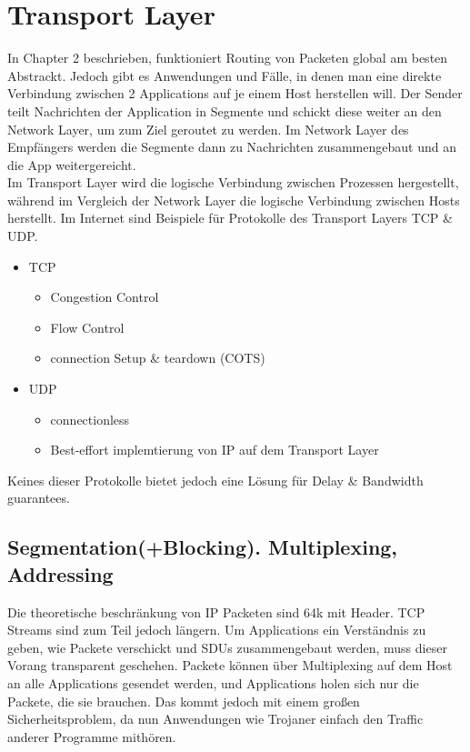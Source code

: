 \section{Transport Layer}
    In Chapter 2 beschrieben, funktioniert Routing von Packeten global am besten Abstrackt. Jedoch gibt es Anwendungen und Fälle, in denen man eine direkte Verbindung zwischen 2 Applications auf je einem Host herstellen will. Der Sender teilt Nachrichten der Application in Segmente und schickt diese weiter an den Network Layer, um zum Ziel geroutet zu werden. Im Network Layer des Empfängers werden die Segmente dann zu Nachrichten zusammengebaut und an die App weitergereicht. \\
    Im Transport Layer wird die logische Verbindung zwischen Prozessen hergestellt, während im Vergleich der Network Layer die logische Verbindung zwischen Hosts herstellt. Im Internet sind Beispiele für Protokolle des Transport Layers TCP \& UDP. 
    \begin{itemize}
        \item TCP
            \begin{itemize}
                \item Congestion Control
                \item Flow Control
                \item connection Setup \& teardown  (COTS)
            \end{itemize}
        \item UDP  
            \begin{itemize}
                \item connectionless
                \item Best-effort implemtierung von IP auf dem Transport Layer
            \end{itemize}
    \end{itemize}
    Keines dieser Protokolle bietet jedoch eine Lösung für Delay \& Bandwidth guarantees.

    \subsection{Segmentation(+Blocking). Multiplexing, Addressing}
        Die theoretische beschränkung von IP Packeten sind 64k mit Header. TCP Streams sind zum Teil jedoch längern. Um Applications ein Verständnis zu geben, wie Packete verschickt und SDUs zusammengebaut werden, muss dieser Vorang transparent geschehen. Packete können über Multiplexing auf dem Host an alle Applications gesendet werden, und Applications holen sich nur die Packete, die sie brauchen. Das kommt jedoch mit einem großen Sicherheitsproblem, da nun Anwendungen wie Trojaner einfach den Traffic anderer Programme mithören. 

